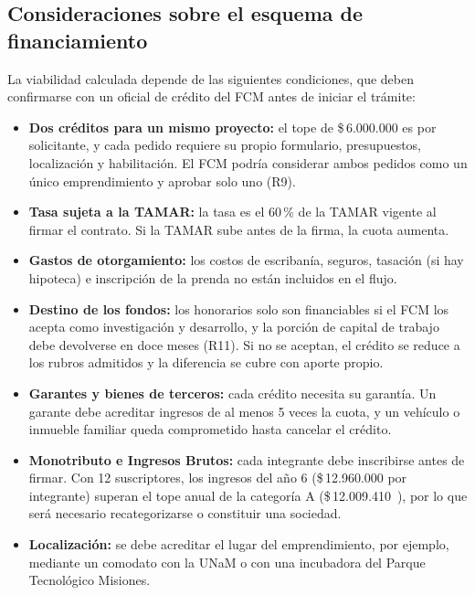     \subsection{Consideraciones sobre el esquema de financiamiento}

        La viabilidad calculada depende de las siguientes condiciones, que deben confirmarse con un oficial de crédito del FCM antes de iniciar el trámite:

        \begin{itemize}
            \item \textbf{Dos créditos para un mismo proyecto:} el tope de \$\,6.000.000 es por solicitante, y cada pedido requiere su propio formulario, presupuestos, localización y habilitación. El FCM podría considerar ambos pedidos como un único emprendimiento y aprobar solo uno (R9).

            \item \textbf{Tasa sujeta a la TAMAR:} la tasa es el 60\,\% de la TAMAR vigente al firmar el contrato. Si la TAMAR sube antes de la firma, la cuota aumenta.

            \item \textbf{Gastos de otorgamiento:} los costos de escribanía, seguros, tasación (si hay hipoteca) e inscripción de la prenda no están incluidos en el flujo.

            \item \textbf{Destino de los fondos:} los honorarios solo son financiables si el FCM los acepta como investigación y desarrollo, y la porción de capital de trabajo debe devolverse en doce meses (R11). Si no se aceptan, el crédito se reduce a los rubros admitidos y la diferencia se cubre con aporte propio.

            \item \textbf{Garantes y bienes de terceros:} cada crédito necesita su garantía. Un garante debe acreditar ingresos de al menos 5 veces la cuota, y un vehículo o inmueble familiar queda comprometido hasta cancelar el crédito.

            \item \textbf{Monotributo e Ingresos Brutos:} cada integrante debe inscribirse antes de firmar. Con 12 suscriptores, los ingresos del año 6 (\$\,12.960.000 por integrante) superan el tope anual de la categoría A (\$\,12.009.410~\cite{monotributo_2026}), por lo que será necesario recategorizarse o constituir una sociedad.

            \item \textbf{Localización:} se debe acreditar el lugar del emprendimiento, por ejemplo, mediante un comodato con la UNaM o con una incubadora del Parque Tecnológico Misiones.


\end{itemize}
